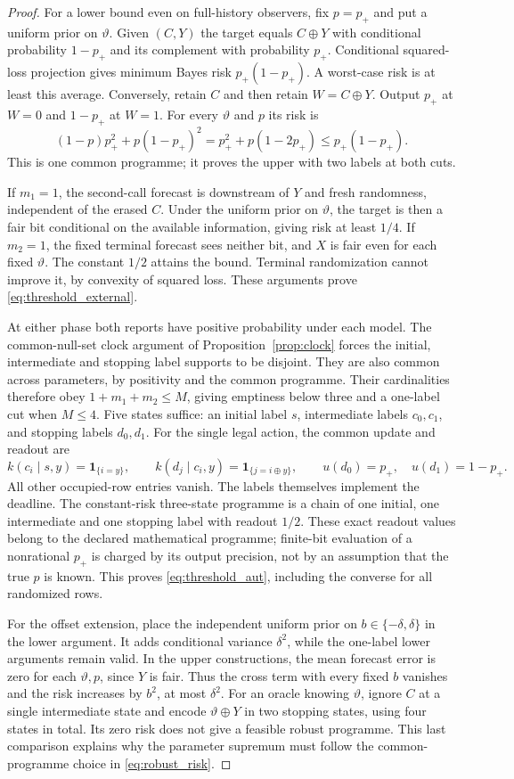 \begin{proof}
For a lower bound even on full-history observers, fix $p=p_+$ and put a uniform prior on $\vartheta$. Given $(C,Y)$ the target equals $C\oplus Y$ with conditional probability $1-p_+$ and its complement with probability $p_+$. Conditional squared-loss projection gives minimum Bayes risk $p_+(1-p_+)$. A worst-case risk is at least this average. Conversely, retain $C$ and then retain $W=C\oplus Y$. Output $p_+$ at $W=0$ and $1-p_+$ at $W=1$. For every $\vartheta$ and $p$ its risk is
\[
 (1-p)p_+^2+p(1-p_+)^2
      =p_+^2+p(1-2p_+)\le p_+(1-p_+).
\]
This is one common programme; it proves the upper with two labels at both cuts.

If $m_1=1$, the second-call forecast is downstream of $Y$ and fresh randomness, independent of the erased $C$. Under the uniform prior on $\vartheta$, the target is then a fair bit conditional on the available information, giving risk at least $1/4$. If $m_2=1$, the fixed terminal forecast sees neither bit, and $X$ is fair even for each fixed $\vartheta$. The constant $1/2$ attains the bound. Terminal randomization cannot improve it, by convexity of squared loss. These arguments prove \eqref{eq:threshold_external}.

At either phase both reports have positive probability under each model. The common-null-set clock argument of Proposition~\ref{prop:clock} forces the initial, intermediate and stopping label supports to be disjoint. They are also common across parameters, by positivity and the common programme. Their cardinalities therefore obey $1+m_1+m_2\le M$, giving emptiness below three and a one-label cut when $M\le4$. Five states suffice: an initial label $s$, intermediate labels $c_0,c_1$, and stopping labels $d_0,d_1$. For the single legal action, the common update and readout are
\[
 k(c_i\mid s,y)=\boldsymbol1_{\{i=y\}},\qquad
 k(d_j\mid c_i,y)=\boldsymbol1_{\{j=i\oplus y\}},\qquad
 u(d_0)=p_+,\quad u(d_1)=1-p_+.
\]
All other occupied-row entries vanish. The labels themselves implement the deadline. The constant-risk three-state programme is a chain of one initial, one intermediate and one stopping label with readout $1/2$. These exact readout values belong to the declared mathematical programme; finite-bit evaluation of a nonrational $p_+$ is charged by its output precision, not by an assumption that the true $p$ is known. This proves \eqref{eq:threshold_aut}, including the converse for all randomized rows.

For the offset extension, place the independent uniform prior on $b\in\{-\delta,\delta\}$ in the lower argument. It adds conditional variance $\delta^2$, while the one-label lower arguments remain valid. In the upper constructions, the mean forecast error is zero for each $\vartheta,p$, since $Y$ is fair. Thus the cross term with every fixed $b$ vanishes and the risk increases by $b^2$, at most $\delta^2$. For an oracle knowing $\vartheta$, ignore $C$ at a single intermediate state and encode $\vartheta\oplus Y$ in two stopping states, using four states in total. Its zero risk does not give a feasible robust programme. This last comparison explains why the parameter supremum must follow the common-programme choice in \eqref{eq:robust_risk}.
\end{proof}


